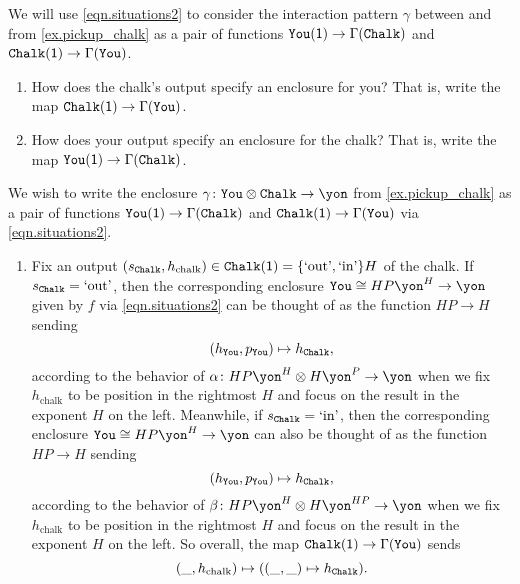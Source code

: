 \documentclass[Book-Poly]{subfiles}
\begin{document}
\begin{exercise}
We will use \eqref{eqn.situations2} to consider the interaction pattern $\gamma$ between  and  from \cref{ex.pickup_chalk} as a pair of functions $\texttt{You}(\textsf{1})\to\Gamma(\texttt{Chalk})$ and $\texttt{Chalk}(\textsf{1})\to\Gamma(\texttt{You})$.
\begin{enumerate}
	\item How does the chalk's output specify an enclosure for you? That is, write the map $\texttt{Chalk}(\textsf{1})\to\Gamma(\texttt{You})$.
	\item How does your output specify an enclosure for the chalk? That is, write the map $\texttt{You}(\textsf{1})\to\Gamma(\texttt{Chalk})$.
\qedhere
\end{enumerate}
\begin{solution}
We wish to write the enclosure $\gamma\colon\const{You}\otimes\const{Chalk}\to\yon$ from \cref{ex.pickup_chalk} as a pair of functions $\texttt{You}(\textsf{1})\to\Gamma(\texttt{Chalk})$ and $\texttt{Chalk}(\textsf{1})\to\Gamma(\texttt{You})$ via \eqref{eqn.situations2}.
\begin{enumerate}
    \item Fix an output $(s_{\texttt{Chalk}}, h_\text{chalk})\in\texttt{Chalk}(\textsf{1})=\{\text{`out'},\text{`in'}\}H$ of the chalk.
    If $s_{\texttt{Chalk}}=\text{`out'}$, then the corresponding enclosure $\const{You}\iso HP\yon^H\to\yon$ given by $f$ via \eqref{eqn.situations2} can be thought of as the function $HP\to H$ sending
    \[
        (h_{\texttt{You}},p_{\texttt{You}})\mapsto h_{\texttt{Chalk}},
    \]
    according to the behavior of $\alpha\colon HP\yon^H\otimes H\yon^P\to\yon$ when we fix $h_\text{chalk}$ to be position in the rightmost $H$ and focus on the result in the exponent $H$ on the left.
    Meanwhile, if $s_{\texttt{Chalk}}=\text{`in'}$, then the corresponding enclosure $\const{You}\iso HP\yon^H\to\yon$ can also be thought of as the function $HP\to H$ sending
    \[
        (h_{\texttt{You}},p_{\texttt{You}})\mapsto h_{\texttt{Chalk}},
    \]
    according to the behavior of $\beta\colon HP\yon^H\otimes H\yon^{HP}\to\yon$ when we fix $h_\text{chalk}$ to be position in the rightmost $H$ and focus on the result in the exponent $H$ on the left.
    So overall, the map $\texttt{Chalk}(\textsf{1})\to\Gamma(\texttt{You})$ sends
    \[
        (\_,h_\text{chalk})\mapsto((\_,\_)\mapsto h_{\texttt{Chalk}}).
    \]
    

\end{enumerate}
\end{solution}
\end{exercise}
\end{document}

